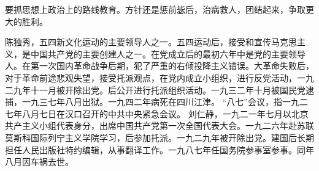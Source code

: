 要抓思想上政治上的路线教育。方针还是惩前毖后，治病救人，团结起来，争取更大的胜利。

\begin{maonote}
陈独秀，五四新文化运动的主要领导人之一。五四运动后，接受和宣传马克思主义，是中国共产党的主要创建人之一。在党成立后的最初六年中是党的主要领导人。在第一次国内革命战争后期，犯了严重的右倾投降主义错误。大革命失败后，对于革命前途悲观失望，接受托派观点，在党内成立小组织，进行反党活动，一九二九年十一月被开除出党。后公开进行托派组织活动。一九三二年十月被国民党逮捕，一九三七年八月出狱。一九四二年病死在四川江津。
“八七”会议，指一九二七年八月七日在汉口召开的中共中央紧急会议。
刘仁静，一九二一年七月以北京共产主义小组代表身分，出席中国共产党第一次全国代表大会。一九二六年赴苏联莫斯科国际列宁主义学院学习，后参加托派。一九二九年被开除出党。建国后长期担任人民出版社特约编辑，从事翻译工作。一九八七年任国务院参事室参事。同年八月因车祸去世。


\end{maonote}
